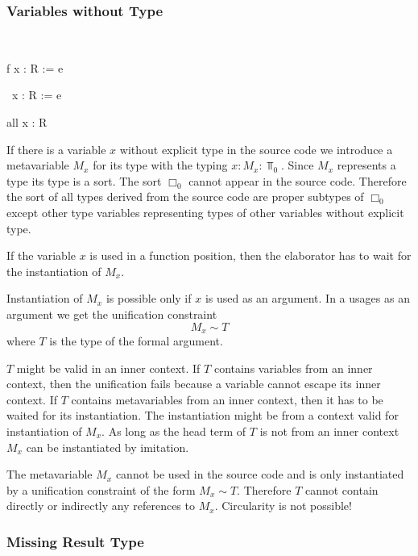 \subsubsection{Variables without Type}
\ \begin{alba}
    f x : R := e

    \ x : R := e

    all x : R
\end{alba}


If there is a variable $x$ without explicit type in the source code we introduce
a metavariable $M_x$ for its type with the typing $x : M_x : \Top_0$. Since
$M_x$ represents a type its type is a sort. The sort $\Box_0$ cannot appear in
the source code. Therefore the sort of all types derived from the source code
are proper subtypes of $\Box_0$ except other type variables representing types
of other variables without explicit type.

If the variable $x$ is used in a function position, then the elaborator has to
wait for the instantiation of $M_x$.

Instantiation of $M_x$ is possible only if $x$ is used as an argument. In a
usages as an argument we get the unification constraint
$$
    M_x \sim T
$$
where $T$ is the type of the formal argument.

$T$ might be valid in an inner context. If $T$ contains variables from an inner
context, then the unification fails because a variable cannot escape its inner
context. If $T$ contains metavariables from an inner context, then it has to be
waited for its instantiation. The instantiation might be from a context valid
for instantiation of $M_x$. As long as the head term of $T$ is not from an inner
context $M_x$ can be instantiated by imitation.

The metavariable $M_x$ cannot be used in the source code and is only
instantiated by a unification constraint of the form $M_x \sim T$. Therefore $T$
cannot contain directly or indirectly any references to $M_x$. Circularity is
not possible!





\subsubsection{Missing Result Type}


